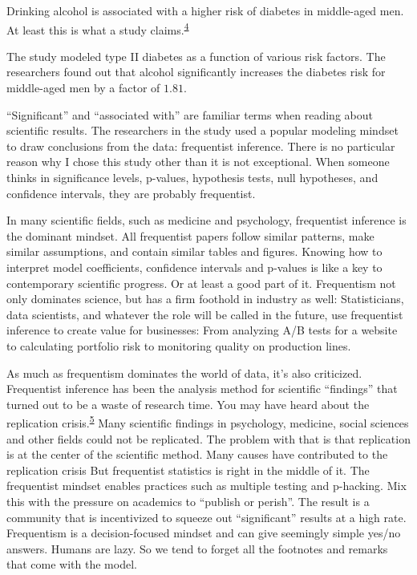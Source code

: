 \documentclass[
  10pt,
]{scrbook}
\begin{document}
Drinking alcohol is associated with a higher risk of diabetes in middle-aged men.
At least this is what a study claims.\textsuperscript{\protect\hyperlink{ref-kao2001alcohol}{4}}

The study modeled type II diabetes as a function of various risk factors.
The researchers found out that alcohol significantly increases the diabetes risk for middle-aged men by a factor of \(1.81\).

``Significant'' and ``associated with'' are familiar terms when reading about scientific results.
The researchers in the study used a popular modeling mindset to draw conclusions from the data: frequentist inference.
There is no particular reason why I chose this study other than it is not exceptional.
When someone thinks in significance levels, p-values, hypothesis tests, null hypotheses, and confidence intervals, they are probably frequentist.

In many scientific fields, such as medicine and psychology, frequentist inference is the dominant mindset.
All frequentist papers follow similar patterns, make similar assumptions, and contain similar tables and figures.
Knowing how to interpret model coefficients, confidence intervals and p-values is like a key to contemporary scientific progress.
Or at least a good part of it.
Frequentism not only dominates science, but has a firm foothold in industry as well:
Statisticians, data scientists, and whatever the role will be called in the future, use frequentist inference to create value for businesses:
From analyzing A/B tests for a website to calculating portfolio risk to monitoring quality on production lines.

As much as frequentism dominates the world of data, it's also criticized.
Frequentist inference has been the analysis method for scientific ``findings'' that turned out to be a waste of research time.
You may have heard about the replication crisis.\textsuperscript{\protect\hyperlink{ref-ioannidis2005most}{5}}
Many scientific findings in psychology, medicine, social sciences and other fields could not be replicated.
The problem with that is that replication is at the center of the scientific method.
Many causes have contributed to the replication crisis
But frequentist statistics is right in the middle of it.
The frequentist mindset enables practices such as multiple testing and p-hacking.
Mix this with the pressure on academics to ``publish or perish''.
The result is a community that is incentivized to squeeze out ``significant'' results at a high rate.
Frequentism is a decision-focused mindset and can give seemingly simple yes/no answers.
Humans are lazy.
So we tend to forget all the footnotes and remarks that come with the model.
\end{document}
